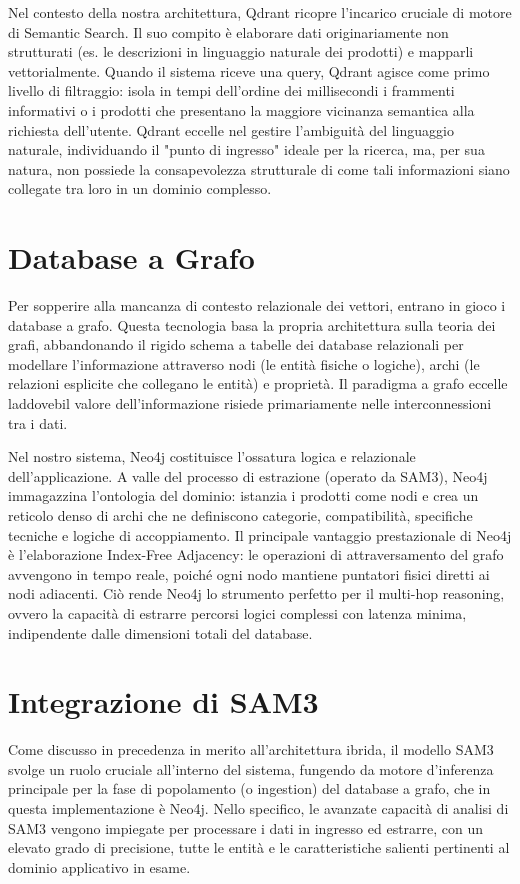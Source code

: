 Nel contesto della nostra architettura, Qdrant ricopre l'incarico cruciale di motore di Semantic Search. Il suo compito è elaborare dati originariamente
non strutturati (es. le descrizioni in linguaggio naturale dei prodotti) e mapparli vettorialmente. Quando il sistema riceve una query,
Qdrant agisce come primo livello di filtraggio: isola in tempi dell'ordine dei millisecondi i frammenti informativi o i prodotti che presentano
la maggiore vicinanza semantica alla richiesta dell'utente. Qdrant eccelle nel gestire l'ambiguità del linguaggio naturale, individuando il "punto di ingresso"
ideale per la ricerca, ma, per sua natura, non possiede la consapevolezza strutturale di come tali informazioni siano collegate tra loro in un dominio complesso.

\section{Database a Grafo}
Per sopperire alla mancanza di contesto relazionale dei vettori, entrano in gioco i database a grafo. Questa tecnologia basa la propria architettura
sulla teoria dei grafi, abbandonando il rigido schema a tabelle dei database relazionali per modellare l'informazione attraverso nodi (le entità fisiche o logiche),
archi (le relazioni esplicite che collegano le entità) e proprietà. Il paradigma a grafo eccelle laddovebil valore dell'informazione risiede primariamente
nelle interconnessioni tra i dati.

Nel nostro sistema, Neo4j costituisce l'ossatura logica e relazionale dell'applicazione. A valle del processo di estrazione (operato da SAM3),
Neo4j immagazzina l'ontologia del dominio: istanzia i prodotti come nodi e crea un reticolo denso di archi che ne definiscono categorie, compatibilità,
specifiche tecniche e logiche di accoppiamento. Il principale vantaggio prestazionale di Neo4j è l'elaborazione Index-Free Adjacency:
le operazioni di attraversamento del grafo avvengono in tempo reale, poiché ogni nodo mantiene puntatori fisici diretti ai nodi adiacenti.
Ciò rende Neo4j lo strumento perfetto per il multi-hop reasoning, ovvero la capacità di estrarre percorsi logici complessi con latenza minima,
indipendente dalle dimensioni totali del database.

\section{Integrazione di SAM3}

Come discusso in precedenza in merito all'architettura ibrida, il modello SAM3 svolge un ruolo cruciale all'interno del sistema,
fungendo da motore d'inferenza principale per la fase di popolamento (o ingestion) del database a grafo, che in questa implementazione è Neo4j.
Nello specifico, le avanzate capacità di analisi di SAM3 vengono impiegate per processare i dati in ingresso ed estrarre, con un elevato grado di precisione,
tutte le entità e le caratteristiche salienti pertinenti al dominio applicativo in esame.

